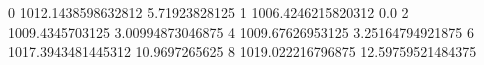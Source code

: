 0 1012.1438598632812 5.71923828125
1 1006.4246215820312 0.0
2 1009.4345703125 3.00994873046875
4 1009.67626953125 3.25164794921875
6 1017.3943481445312 10.9697265625
8 1019.022216796875 12.59759521484375
